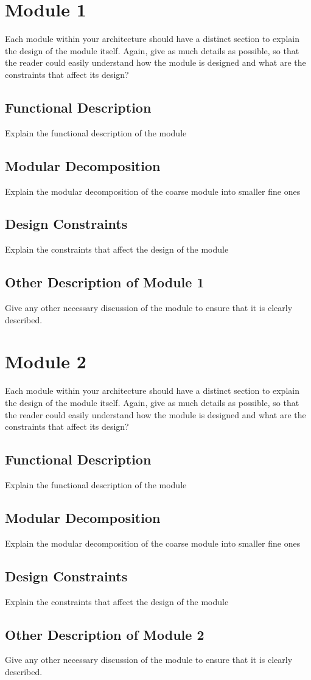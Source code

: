 \section{Module 1}
Each module within your architecture should have a distinct section to explain the design of the module itself. Again, give as much details as possible, so that the reader could easily understand how the module is designed and what are the constraints that affect its design?

\subsection{Functional Description}
Explain the functional description of the module

\subsection{Modular Decomposition}
Explain the modular decomposition of the coarse module into smaller fine ones

\subsection{Design Constraints}
Explain the constraints that affect the design of the module

\subsection{Other Description of Module 1}
Give any other necessary discussion of the module to ensure that it is clearly described.

\section{Module 2}
Each module within your architecture should have a distinct section to explain the design of the module itself. Again, give as much details as possible, so that the reader could easily understand how the module is designed and what are the constraints that affect its design?

\subsection{Functional Description}
Explain the functional description of the module

\subsection{Modular Decomposition}
Explain the modular decomposition of the coarse module into smaller fine ones

\subsection{Design Constraints}
Explain the constraints that affect the design of the module

\subsection{Other Description of Module 2}
Give any other necessary discussion of the module to ensure that it is clearly described.
